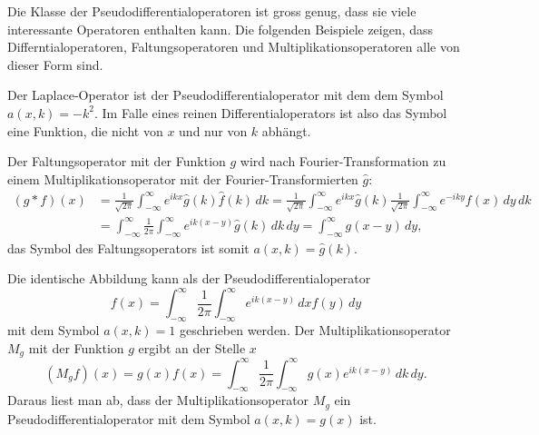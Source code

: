 Die Klasse der Pseudodifferentialoperatoren ist gross genug, dass sie
viele interessante Operatoren enthalten kann.
Die folgenden Beispiele zeigen, dass Differntialoperatoren,
Faltungsoperatoren und Multiplikationsoperatoren alle von dieser
Form sind.

\begin{beispiel}
Der Laplace-Operator ist der Pseudodifferentialoperator mit dem
dem Symbol
\(
a(x,k)=
-k^2
\).
Im Falle eines reinen Differentialoperators ist also das Symbol eine 
Funktion, die nicht von $x$ und nur von $k$ abhängt.
\end{beispiel}

\begin{beispiel}
Der Faltungsoperator mit der Funktion $g$ wird nach Fourier-Transformation
zu einem Multiplikationsoperator mit der Fourier-Transformierten $\hat{g}$:
\begin{align*}
(g * f)(x)
&=
\frac{1}{\!\sqrt{2\pi}}
\int_{-\infty}^\infty e^{ikx} \hat{g}(k) \hat{f}(k) \,dk
=
\frac{1}{\!\sqrt{2\pi}}
\int_{-\infty}^\infty
e^{ikx}
\hat{g}(k) 
\frac{1}{\!\sqrt{2\pi}}
\int_{-\infty}^\infty
e^{-iky}
f(x)
\,dy
\,dk
\\
&=
\int_{-\infty}^\infty
\frac{1}{2\pi}
\int_{-\infty}^\infty
e^{ik(x-y)}
\hat{g}(k)
\,dk
\,dy
=
\int_{-\infty}^\infty
g(x-y)
\,dy,
\end{align*}
das Symbol des Faltungsoperators ist somit $a(x,k)=\hat{g}(k)$.
\end{beispiel}

\begin{beispiel}
Die identische Abbildung kann als der Pseudodifferentialoperator
\[
f(x)
=
\int_{-\infty}^\infty 
\frac{1}{2\pi}
\int_{-\infty}^\infty 
e^{ik(x-y)}
\,dx
f(y)
\,dy
\]
mit dem Symbol $a(x,k)=1$ geschrieben werden.
Der Multiplikationsoperator $M_g$ mit der Funktion $g$ ergibt an
der Stelle $x$
\[
(M_gf)(x)
=
g(x) f(x)
=
\int_{-\infty}^\infty
\frac{1}{2\pi}
\int_{-\infty}^\infty
g(x) e^{ik(x-y)}
\,dk
\,dy.
\]
Daraus liest man ab, dass der Multiplikationsoperator $M_g$ ein
Pseudodifferentialoperator mit dem Symbol $a(x,k)=g(x)$ ist.
\end{beispiel}




